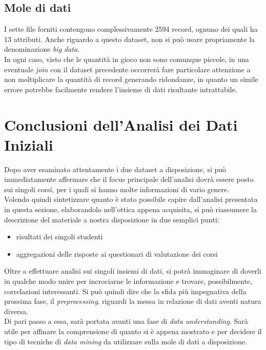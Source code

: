 \subsection{Mole di dati}

I sette file forniti contengono complessivamente 2594 record, ognuno dei quali ha 13 attributi. Anche riguardo a questo dataset, non si può usare propriamente la denominazione \textit{big data}.\\

In ogni caso, visto che le quantità in gioco non sono comunque piccole, in una eventuale \textit{join} con il dataset precedente occorrerà fare particolare attenzione a non moltiplicare la quantità di record generando ridondanze, in quanto un simile errore potrebbe facilmente rendere l'insieme di dati risultante intrattabile.

\section{Conclusioni dell'Analisi dei Dati Iniziali}

Dopo aver esaminato attentamente i due dataset a disposizione, si può immediatamente affermare che il focus principale dell'analisi dovrà essere posto sui singoli corsi, per i quali si hanno molte informazioni di vario genere. \\

Volendo quindi sintetizzare quanto è stato possibile capire dall'analisi presentata in questa sezione, elaborandolo nell'ottica appena acquisita, si può riassumere la descrizione del materiale a nostra disposizione in due semplici punti:

\begin{itemize}
	\item risultati dei singoli studenti
	\item aggregazioni delle risposte ai questionari di valutazione dei corsi
\end{itemize}

Oltre a effettuare analisi sui singoli insiemi di dati, si potrà immaginare di doverli in qualche modo unire per incrociarne le informazione e trovare, possibilmente, correlazioni interessanti. Si può quindi dire che la sfida più impegnativa della prossima fase, il \textit{preprocessing}, riguardi la messa in relazione di dati aventi natura diversa. \\

Di pari passo a essa, sarà portata avanti una fase di \textit{data understanding}. Sarà utile per affinare la comprensione di quanto si è appena mostrato e per decidere il tipo di tecniche di \textit{data mining} da utilizzare sulla mole di dati a disposizione.
